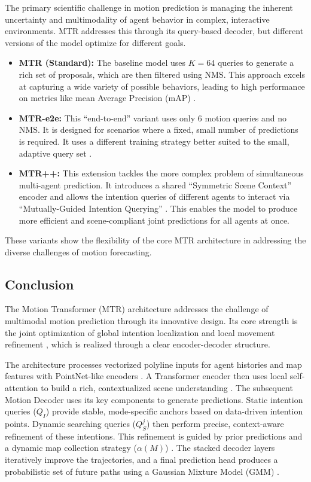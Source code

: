 The primary scientific challenge in motion prediction is managing the inherent uncertainty and multimodality of agent behavior in complex, interactive environments. MTR addresses this through its query-based decoder, but different versions of the model optimize for different goals.

\begin{itemize}
    \item \textbf{MTR (Standard):} The baseline model uses $K=64$ queries to generate a rich set of proposals, which are then filtered using NMS. This approach excels at capturing a wide variety of possible behaviors, leading to high performance on metrics like mean Average Precision (mAP) \cite{Shi2022MTR}.
    \item \textbf{MTR-e2e:} This ``end-to-end'' variant uses only 6 motion queries and no NMS. It is designed for scenarios where a fixed, small number of predictions is required. It uses a different training strategy better suited to the small, adaptive query set \cite{Shi2022MTR}.
    \item \textbf{MTR++:} This extension tackles the more complex problem of simultaneous multi-agent prediction. It introduces a shared ``Symmetric Scene Context'' encoder and allows the intention queries of different agents to interact via ``Mutually-Guided Intention Querying'' \cite{Shi2023MTRplusplus}. This enables the model to produce more efficient and scene-compliant joint predictions for all agents at once.
\end{itemize}

These variants show the flexibility of the core MTR architecture in addressing the diverse challenges of motion forecasting.

\subsection{Conclusion}
\label{sec:conclusion}

The Motion Transformer (MTR) architecture addresses the challenge of multimodal motion prediction through its innovative design. Its core strength is the joint optimization of global intention localization and local movement refinement \cite{Shi2022MTR}, which is realized through a clear encoder-decoder structure.

The architecture processes vectorized polyline inputs for agent histories and map features with PointNet-like encoders \cite{gao2020vectornet, PointNet2017}. A Transformer encoder then uses local self-attention to build a rich, contextualized scene understanding \cite{Shi2022MTR}. The subsequent Motion Decoder uses its key components to generate predictions. Static intention queries ($Q_I$) provide stable, mode-specific anchors based on data-driven intention points. Dynamic searching queries ($Q_S^j$) then perform precise, context-aware refinement of these intentions. This refinement is guided by prior predictions and a dynamic map collection strategy ($\alpha(M)$) \cite{Shi2022MTR}. The stacked decoder layers iteratively improve the trajectories, and a final prediction head produces a probabilistic set of future paths using a Gaussian Mixture Model (GMM) \cite{Bishop1994MDN}.

